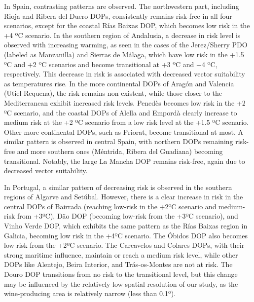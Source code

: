 In Spain, contrasting patterns are observed. The northwestern part, including
Rioja and Ribera del Duero DOPs, consistently remains risk-free in all four
scenarios, except for the coastal Rías Baixas DOP, which becomes low risk in
the +4 ºC scenario. In the southern region of Andalusia, a decrease in risk
level is observed with increasing warming, as seen in the cases of the
Jerez/Sherry PDO (labeled as Manzanilla) and Sierras de Málaga, which have low
risk in the +1.5 ºC and +2 ºC scenarios and become transitional at +3 ºC and +4
ºC, respectively. This decrease in risk is associated with decreased vector
suitability as temperatures rise. In the more continental DOPs of Aragón and
Valencia (Utiel-Requena), the risk remains non-existent, while those closer to
the Mediterranean exhibit increased risk levels. Penedès becomes low risk in
the +2 ºC scenario, and the coastal DOPs of Alella and Empordà clearly increase
to medium risk at the +2 ºC scenario from a low risk level at the +1.5 ºC
scenario. Other more continental DOPs, such as Priorat, become transitional at
most. A similar pattern is observed in central Spain, with northern DOPs
remaining risk-free and more southern ones (Méntrida, Ribera del Guadiana)
becoming transitional. Notably, the large La Mancha DOP remains risk-free,
again due to decreased vector suitability.

In Portugal, a similar pattern of decreasing risk is observed in the southern
regions of Algarve and Setúbal. However, there is a clear increase in risk in
the central DOPs of Bairrada (reaching low-risk in the +2ºC scenario and
medium-risk from +3ºC), Dão DOP (becoming low-risk from the +3ºC scenario), and
Vinho Verde DOP, which exhibits the same pattern as the Rías Baixas region in
Galicia, becoming low risk in the +4ºC scenario. The Óbidos DOP also becomes
low risk from the +2ºC scenario. The Carcavelos and Colares DOPs, with their
strong maritime influence, maintain or reach a medium risk level, while other
DOPs like Alentejo, Beira Interior, and Trás-os-Montes are not at risk. The
Douro DOP transitions from no risk to the transitional level, but this change
may be influenced by the relatively low spatial resolution of our study, as the
wine-producing area is relatively narrow (less than 0.1º).

